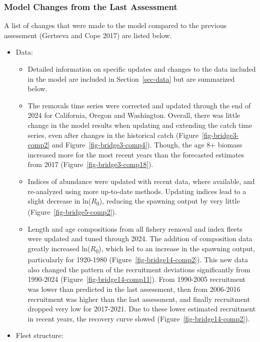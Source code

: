 \documentclass[
]{scrartcl}
\providecommand{\tightlist}{%
  \setlength{\itemsep}{0pt}\setlength{\parskip}{0pt}}\usepackage{longtable,booktabs,array}
\begin{document}
\subsubsection{Model Changes from the Last
Assessment}\label{sec-changes}

A list of changes that were made to the model compared to the previous
assessment (Gertseva and Cope 2017) are listed below.

\begin{itemize}
\tightlist
\item
  Data:

  \begin{itemize}
  \tightlist
  \item
    Detailed information on specific updates and changes to the data
    included in the model are included in Section~\ref{sec-data} but are
    summarized below.
  \item
    The removals time series were corrected and updated through the end
    of 2024 for California, Oregon and Washington. Overall, there was
    little change in the model results when updating and extending the
    catch time series, even after changes in the historical catch
    (Figure~\ref{fig-bridge3-comp2} and Figure~\ref{fig-bridge3-comp4}).
    Though, the age 8+ biomass increased more for the most recent years
    than the forecasted estimates from 2017
    (Figure~\ref{fig-bridge3-comp18}).\\
  \item
    Indices of abundance were updated with recent data, where available,
    and re-analyzed using more up-to-date methods. Updating indices lead
    to a slight decrease in ln(\(R\)\textsubscript{0}), reducing the
    spawning output by very little (Figure~\ref{fig-bridge5-comp2}).
  \item
    Length and age compositions from all fishery removal and index
    fleets were updated and tuned through 2024. The addition of
    composition data greatly increased ln(\(R\)\textsubscript{0}), which
    led to an increase in the spawning output, particularly for
    1920-1980 (Figure~\ref{fig-bridge14-comp2}). This new data also
    changed the pattern of the recruitment deviations significantly from
    1990-2024 (Figure~\ref{fig-bridge14-comp11}). From 1990-2005
    recruitment was lower than predicted in the last assessment, then
    from 2006-2016 recruitment was higher than the last assessment, and
    finally recruitment dropped very low for 2017-2021. Due to these
    lower estimated recruitment in recent years, the recovery curve
    slowed (Figure~\ref{fig-bridge14-comp2}).
  \end{itemize}
\item
  Fleet structure:


\end{itemize}
\end{document}
